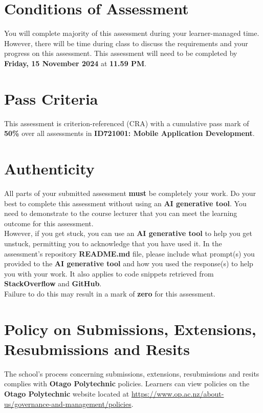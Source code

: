 \documentclass{article}
\begin{document}
\section*{Conditions of Assessment}
You will complete majority of this assessment during your learner-managed time. However, there will be time during class to discuss the requirements and your progress on this assessment. This assessment will need to be completed by \textbf{Friday, 15 November 2024} at \textbf{11.59 PM}.


\section*{Pass Criteria}
This assessment is criterion-referenced (CRA) with a cumulative pass mark of \textbf{50\%} over all assessments in \textbf{ID721001: Mobile Application Development}.

\section*{Authenticity}
All parts of your submitted assessment \textbf{must} be completely your work. Do your best to complete this assessment without using an \textbf{AI generative tool}. You need to demonstrate to the course lecturer that you can meet the learning outcome for this assessment. \\
 
 However, if you get stuck, you can use an \textbf{AI generative tool} to help you get unstuck, permitting you to acknowledge that you have used it. In the assessment's repository \textbf{README.md} file, please include what prompt(s) you provided to the \textbf{AI generative tool} and how you used the response(s) to help you with your work. It also applies to code snippets retrieved from \textbf{StackOverflow} and \textbf{GitHub}. \\
 
 Failure to do this may result in a mark of \textbf{zero} for this assessment.

\section*{Policy on Submissions, Extensions, Resubmissions and Resits}
The school's process concerning submissions, extensions, resubmissions and resits complies with \textbf{Otago Polytechnic} policies. Learners can view policies on the \textbf{Otago Polytechnic} website located at \href{https://www.op.ac.nz/about-us/governance-and-management/policies}{https://www.op.ac.nz/about-us/governance-and-management/policies}.
\end{document}
